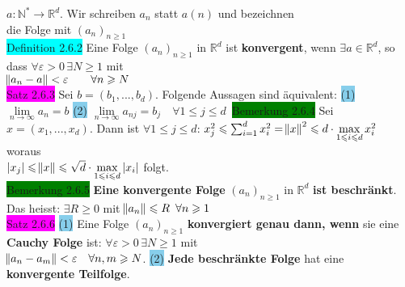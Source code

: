 \documentclass[10pt]{article}
\begin{document}
                \textcolor{NavyBlue}{$a:\mathbb{N}^*\longrightarrow\mathbb{R}^d$}. 
                Wir schreiben $a_n$ statt $a(n)$ und bezeichnen \\
        \indent die Folge mit \textcolor{NavyBlue}{$(a_n)_{n\geqslant1}$}\\
\colorbox{cyan}{Definition 2.6.2} Eine Folge $(a_n)_{n\geqslant1}$ in $\mathbb{R}^d$ 
                ist \textbf{konvergent}, wenn 
                \textcolor{NavyBlue}{$\exists a\in\mathbb{R}^d$}, so dass
                \textcolor{NavyBlue}{$\forall\varepsilon >0\,\exists N\geqslant1$} mit \\
        \indent \textcolor{NavyBlue}{$\norm{a_n-a}<\varepsilon\qquad\forall n\geqslant N$}\\
\colorbox{magenta}{Satz 2.6.3} Sei \textcolor{NavyBlue}{$b=(b_1,...,b_d)$}. 
                Folgende Aussagen sind äquivalent:
                \colorbox{SkyBlue}{(1)} \textcolor{NavyBlue}{$\lim\limits_{n\to\infty}a_n=b$}
                \colorbox{SkyBlue}{(2)} 
                \textcolor{NavyBlue}{
                $\lim\limits_{n\to\infty}a_{nj}=b_j\quad\forall 1\leqslant j\leqslant d$}\
\colorbox{green}{Bemerkung 2.6.4} Sei \textcolor{NavyBlue}{$x=(x_1,...,x_d)$}. Dann ist 
                \textcolor{NavyBlue}{$\forall 1\leqslant j\leqslant d$:
                $x^2_j\leqslant\sum_{i=1}^{d}x_i^2=\norm{x}^2\leqslant 
                d\cdot \max\limits_{1\leqslant i\leqslant d}x_i^2$} woraus \\
                \indent \textcolor{NavyBlue}{$|x_j|\leqslant \norm{x}\leqslant
                \sqrt{d}\cdot\max\limits_{1\leqslant i\leqslant d}|x_i|$} folgt.\\
\colorbox{green}{Bemerkung 2.6.5} \textbf{Eine konvergente Folge} $(a_n)_{n\geqslant1}$ in 
                $\mathbb{R}^d$ \textbf{ist beschränkt}. Das heisst: 
                \textcolor{NavyBlue}{$\exists R\geqslant0$} mit 
                \textcolor{NavyBlue}{$\norm{a_n}\leqslant R\enspace\forall n\geqslant1$}\\
\colorbox{magenta}{Satz 2.6.6} \colorbox{SkyBlue}{(1)} Eine Folge $(a_n)_{n\geqslant1}$ 
                \textbf{konvergiert genau dann, wenn} sie eine 
                \textbf{Cauchy Folge} ist: 
                \textcolor{NavyBlue}{$\forall\varepsilon >0\,\exists N\geqslant1$} mit \\
        \indent \textcolor{NavyBlue}{$\norm{a_n-a_m}<\varepsilon\quad\forall n,m\geqslant N$}.
                \colorbox{SkyBlue}{(2)} \textbf{Jede beschränkte Folge} hat eine 
                \textbf{konvergente Teilfolge}.\\
\end{document}
